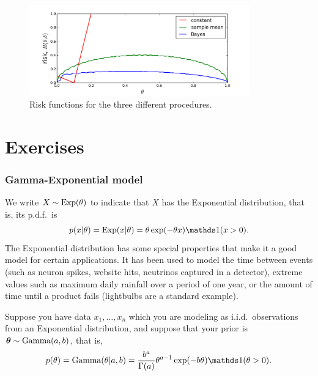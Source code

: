 \documentclass[12pt]{article}
\begin{document}
\begin{figure}
  \begin{center}
    \includegraphics[width=0.85\textwidth]{risk.png}
  \end{center}
  \caption{Risk functions for the three different procedures.}
  \label{figure:risk}
\end{figure}






\section{Exercises}

\subsubsection*{Gamma-Exponential model}

We write $X\sim\operatorname*{Exp}(\theta)$ to indicate that $X$ has the Exponential distribution, that is, its p.d.f.\ is
$$ p(x|\theta) =\Exp(x|\theta) = \theta\exp(-\theta x)\I(x>0). $$
The Exponential distribution has some special properties that make it a good model for certain applications. It has been used to model the time between events (such as neuron spikes, website hits, neutrinos captured in a detector), extreme values such as maximum daily rainfall over a period of one year, or the amount of time until a product fails (lightbulbs are a standard example).

Suppose you have data $x_1,\dotsc,x_n$ which you are modeling as i.i.d.\ observations from an Exponential distribution, and suppose that your prior is ${\bm\theta}\sim\operatorname*{Gamma}(a,b)$, that is,
$$ p(\theta) = \Ga(\theta|a,b) = \frac{b^a}{\Gamma(a)}\theta^{a-1}\exp(-b\theta) \I(\theta>0). $$
\end{document}
